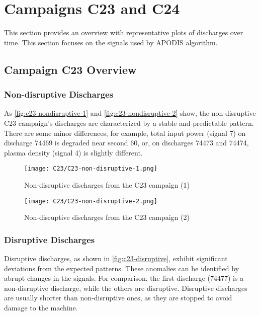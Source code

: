 \chapter{Campaigns C23 and C24}\label{apx:campaigns}

This section provides an overview with representative plots of discharges over time. This section focuses on the signals used by \ac{APODIS} algorithm.

\section{Campaign C23 Overview}

\subsection{Non-disruptive Discharges}

As \autoref{fig:c23-nondisruptive-1} and \autoref{fig:c23-nondisruptive-2} show, the non-disruptive C23 campaign's discharges are characterized by a stable and predictable pattern. There are some minor differences, for example, total input power (signal 7) on discharge 74469 is degraded near second 60, or, on discharges 74473 and 74474, plasma density (signal 4) is slightly different.

\begin{figure}[H]
    \centering
    \texttt{[image: C23/C23-non-disruptive-1.png]}
    \caption{Non-disruptive discharges from the C23 campaign (1)}
    \label{fig:c23-nondisruptive-1}    
\end{figure}

\begin{figure}[H]
    \centering
    \texttt{[image: C23/C23-non-disruptive-2.png]}
    \caption{Non-disruptive discharges from the C23 campaign (2)}
    \label{fig:c23-nondisruptive-2}    
\end{figure}

\subsection{Disruptive Discharges}

Disruptive discharges, as shown in \autoref{fig:c23-disruptive}, exhibit significant deviations from the expected patterns. These anomalies can be identified by abrupt changes in the signals. For comparison, the first discharge (74477) is a non-disruptive discharge, while the others are disruptive. Disruptive discharges are usually shorter than non-disruptive ones, as they are stopped to avoid damage to the machine. 

